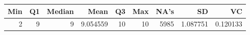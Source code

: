 
\begin{tabular}[t]{rrrrrrrrr}
\toprule
Min & Q1 & Median & Mean & Q3 & Max & NA's & SD & VC\\
\midrule
2 & 9 & 9 & 9.054559 & 10 & 10 & 5985 & 1.087751 & 0.120133\\
\bottomrule
\end{tabular}